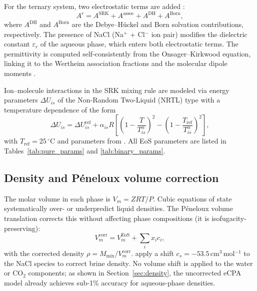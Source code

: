 \documentclass[preprint,12pt,authoryear]{elsarticle}
\begin{document}
For the ternary system, two electrostatic terms are added \citep{MaribMogensen2015}:
\begin{equation}
  A^r = A^{\text{SRK}} + A^{\text{assoc}} + A^{\text{DH}} + A^{\text{Born}},
  \label{eq:Ar_ecpa}
\end{equation}
where $A^{\text{DH}}$ and $A^{\text{Born}}$ are the Debye--Hückel and Born solvation
contributions, respectively.
The presence of NaCl (Na$^+$ + Cl$^-$ ion pair) modifies the dielectric constant $\varepsilon_r$
of the aqueous phase, which enters both electrostatic terms.
The permittivity is computed self-consistently from the Onsager--Kirkwood equation, linking
it to the Wertheim association fractions and the molecular dipole moments \citep{Coelho2025}.

Ion--molecule interactions in the SRK mixing rule are modeled via energy
parameters $\Delta U_{is}$ of the Non-Random Two-Liquid (NRTL) type with a temperature dependence of the form
\begin{equation}
  \Delta U_{is} = \Delta U_{is}^{\text{ref}} + \alpha_{is}R\!\left[
    \left(1 - \frac{T}{T_{is}^\alpha}\right)^2 - \left(1-\frac{T_{\text{ref}}}{T_{is}^\alpha}\right)^2
  \right],
  \label{eq:DeltaU}
\end{equation}
with $T_{\text{ref}} = 25\,^\circ$C and parameters from \citet{Coelho2025}.
All EoS parameters are listed in Tables~\ref{tab:pure_params} and \ref{tab:binary_params}.

\subsection{Density and Péneloux volume correction}
\label{sec:peneloux}

The molar volume in each phase is $V_m = ZRT/P$.
Cubic equations of state systematically over- or underpredict liquid densities.
The Péneloux volume translation \citep{Peneloux1982} corrects this without affecting
phase compositions (it is isofugacity-preserving):
\begin{equation}
  V_m^{\text{corr}} = V_m^{\text{EoS}} + \sum_i x_i c_i,
  \label{eq:peneloux}
\end{equation}
with the corrected density $\rho = M_{\text{mix}}/V_m^{\text{corr}}$.
\citet{Coelho2025} apply a shift $c_s = -53.5$\,cm$^3$\,mol$^{-1}$ to the NaCl species
to correct brine density.
No volume shift is applied to the water or CO$_2$ components; as shown in
Section~\ref{sec:density}, the uncorrected eCPA model already achieves sub-1\% accuracy
for aqueous-phase densities.
\end{document}
